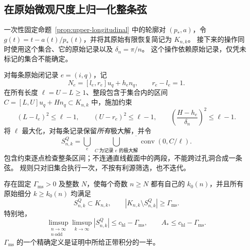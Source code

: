 \subsection{在原始微观尺度上归一化整条弦}
\label{subsec:upper-chords}

一次性固定命题~\ref{prop:upper-longitudinal} 中的轮廓对 $(p_*,a)$，令 $g(t)=t-a(t)/p_*(t)$，并将其原始有限恢复简记为 $K_{n,k}$。
接下来的操作同时使用这个集合、它的原始记录以及 $\delta_n=\pi/n$。
这个操作依赖原始记录，仅凭未标记的集合不能确定。

对每条原始闭记录 $e=(i,q)$，记
\[
 N_e=[l_e,r_e]u_q+h_e n_q,\qquad r_e-l_e=1.
\]
在所有长度 $\ell=U-L\ge1$、整段包含于集合内的区间 $C=[L,U]u_q+Hn_q\subset K_{n,k}$ 中，施加约束
\begin{equation}\label{eq:upper-Q}
 (L-l_e)^2\le\ell-1,\qquad (U-r_e)^2\le\ell-1,
 \qquad \left(\frac{H-h_e}{\delta_n}\right)^2\le\ell-1.
\end{equation}
将 $\ell$ 最大化，对每条记录保留\emph{所有}极大解，并令
\begin{equation}\label{eq:upper-Q-output}
 S^Q_{n,k}=\overline{\bigcup_e\ \bigcup_{C\ \text{为记录 }e\text{ 的极大解}}
                              \operatorname{conv}(0,C/\ell)}.
\end{equation}
包含约束逐点检查整条区间；不连通直线截面中的两段，不能跨过孔洞合成一条弦。
规则只对旧集合执行一次，不按有利源筛选，也不迭代。

\begin{theorem}[归一化约束延长给出的固定实际面积删除]
\label{thm:upper-Q}
存在固定 $\Gamma_{\mathrm{ms}}>0$ 及整数 $N$，使每个奇数 $n\ge N$ 都有自己的 $k_0(n)$，并且所有原始细分 $k\ge k_0(n)$ 均满足
\[
 S^Q_{n,k}\subset K_{n,k},\qquad
 |K_{n,k}\setminus S^Q_{n,k}|\ge\Gamma_{\mathrm{ms}}.
\]
特别地，
\begin{equation}\label{eq:upper-Q-limit}
 \limsup_{\substack{n\to\infty\\n\ \mathrm{odd}}}
 \limsup_{k\to\infty}|S^Q_{n,k}|
                  \le c_{\mathrm{hl}}-\Gamma_{\mathrm{ms}},
 \qquad A_*\le c_{\mathrm{hl}}-\Gamma_{\mathrm{ms}}.
\end{equation}
$\Gamma_{\mathrm{ms}}$ 的一个精确定义是证明中所给正带积分的一半。
\end{theorem}

